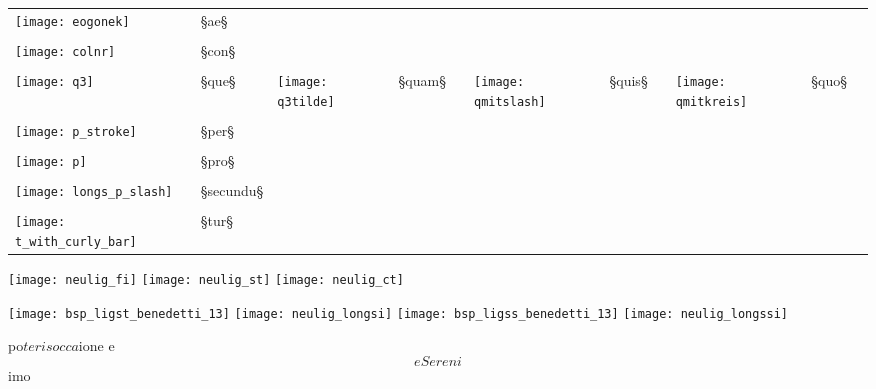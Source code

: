 \begin{liste}
\begin{longtable}[l]{lllllllllll} 
\texttt{[image: eogonek]} & §{ae}§ \\ \\
\texttt{[image: colnr]} & §{con}§ 
\\ \\
\texttt{[image: q3]} & §{que}§ 
&
\texttt{[image: q3tilde]} & §{quam}§ 
&&
\texttt{[image: qmitslash]} & §{quis}§ 
&&
\texttt{[image: qmitkreis]} & §{quo}§ 
\\ \\
\texttt{[image: p\_stroke]} & §{per}§ 
\\ \\
\texttt{[image: p]} & §{pro}§ 
\\ \\
\texttt{[image: longs\_p\_slash]} & §{secundu}§ 
\\ \\
\texttt{[image: t\_with\_curly\_bar]} & §{tur}§
\end{longtable}
\end{liste}

\begin{example}

\texttt{[image: neulig\_fi]} \quad
\texttt{[image: neulig\_st]} \quad
\texttt{[image: neulig\_ct]}

\vspace{-3mm}

\texttt{[image: bsp\_ligst\_benedetti\_13]} \quad
\texttt{[image: neulig\_longsi]} \quad
\texttt{[image: bsp\_ligss\_benedetti\_13]} \quad
\texttt{[image: neulig\_longssi]}

\vspace{-3mm}
\begin{typeLatin}
po$teris        occa$ione          e$$e     Sereni$$imo
\end{typeLatin}

\end{example}

